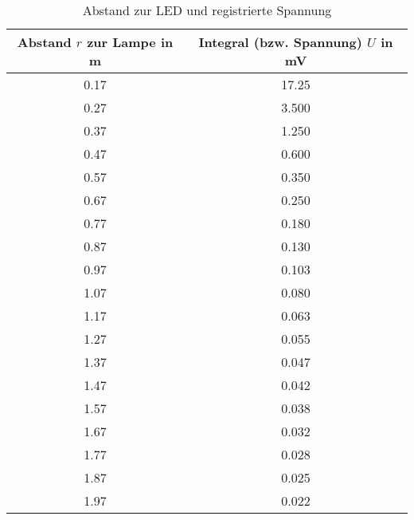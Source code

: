 \begin{table}[h!]
\begin{center}
\begin{tabular}{c | c}
	Abstand $r$ zur Lampe in \si{\metre} & Integral (bzw. Spannung) $U$ in \si{\milli\volt} \\
	\hline
	0.17 & 17.25 \\
	0.27 & 3.500 \\
	0.37 & 1.250 \\
	0.47 & 0.600 \\
	0.57 & 0.350 \\
	0.67 & 0.250 \\
	0.77 & 0.180 \\
	0.87 & 0.130 \\
	0.97 & 0.103 \\
	1.07 & 0.080 \\
	1.17 & 0.063 \\
	1.27 & 0.055 \\
	1.37 & 0.047 \\
	1.47 & 0.042 \\
	1.57 & 0.038 \\
	1.67 & 0.032 \\
	1.77 & 0.028 \\
	1.87 & 0.025 \\
	1.97 & 0.022
\end{tabular}
\caption{Abstand zur LED und registrierte Spannung}
\label{Tabelle_Lampe}
\end{center}
\end{table}